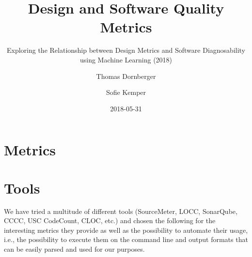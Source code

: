 \documentclass{scrartcl}
\begin{document}
\title{Design and Software Quality Metrics}
\subtitle{Exploring the Relationship between Design Metrics and Software
Diagnosability using Machine Learning (2018)}
\author{Thomas Dornberger \and Sofie Kemper}
\date{2018-05-31}

\maketitle

\section{Metrics}










\section{Tools}

We have tried a multitude of different tools (SourceMeter, LOCC, SonarQube,
CCCC, USC CodeCount, CLOC, etc.) and chosen the following for the interesting
metrics they provide as well as the possibility to automate their usage, i.e.,
the possibility to execute them on the command line and output formats that can
be easily parsed and used for our purposes.








\end{document}
